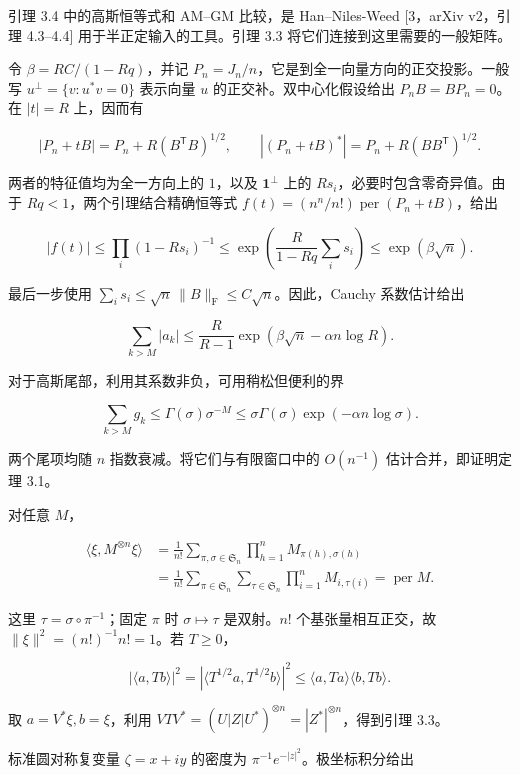 \documentclass[11pt,a4paper]{article}
\begin{document}
引理 3.4 中的高斯恒等式和 AM--GM 比较，是 Han--Niles-Weed {[}3，arXiv v2，引理 4.3--4.4{]} 用于半正定输入的工具。引理 3.3 将它们连接到这里需要的一般矩阵。

令 \(\beta=RC/(1-Rq)\)，并记 \(P_n=J_n/n\)，它是到全一向量方向的正交投影。一般写 \(u^\perp=\{v:u^*v=0\}\) 表示向量 \(u\) 的正交补。双中心化假设给出 \(P_nB=BP_n=0\)。在 \(|t|=R\) 上，因而有

\[
|P_n+tB|=P_n+R(B^{\mathsf T}B)^{1/2},
\qquad
|(P_n+tB)^*|=P_n+R(BB^{\mathsf T})^{1/2}.
\]

两者的特征值均为全一方向上的 \(1\)，以及 \(\mathbf1^\perp\) 上的 \(Rs_i\)，必要时包含零奇异值。由于 \(Rq<1\)，两个引理结合精确恒等式 \(f(t)=(n^n/n!)\operatorname{per}(P_n+tB)\)，给出

\[
|f(t)|\le\prod_i(1-Rs_i)^{-1}
\le\exp\!\left(\frac{R}{1-Rq}\sum_i s_i\right)
\le\exp(\beta\sqrt n).
\]

最后一步使用 \(\sum_i s_i\le\sqrt n\,\|B\|_{\mathrm F}\le C\sqrt n\)。因此，Cauchy 系数估计给出

\[
\sum_{k>M}|a_k|
\le\frac{R}{R-1}
\exp\!\left(\beta\sqrt n-\alpha n\log R\right).
\]

对于高斯尾部，利用其系数非负，可用稍松但便利的界

\[
\sum_{k>M}g_k
\le \Gamma(\sigma)\sigma^{-M}
\le\sigma\Gamma(\sigma)\exp\!\left(-\alpha n\log\sigma\right).
\]

两个尾项均随 \(n\) 指数衰减。将它们与有限窗口中的 \(O(n^{-1})\) 估计合并，即证明定理 3.1。

对任意 \(M\)，

\[
\begin{aligned}
\langle\xi,M^{\otimes n}\xi\rangle
&=\frac1{n!}\sum_{\pi,\sigma\in \mathfrak S_n}\prod_{h=1}^nM_{\pi(h),\sigma(h)}\\
&=\frac1{n!}\sum_{\pi\in \mathfrak S_n}\sum_{\tau\in \mathfrak S_n}\prod_{i=1}^nM_{i,\tau(i)}
=\operatorname{per}M.
\end{aligned}
\]

这里 \(\tau=\sigma\circ\pi^{-1}\)；固定 \(\pi\) 时 \(\sigma\mapsto\tau\) 是双射。\(n!\) 个基张量相互正交，故 \(\|\xi\|^2=(n!)^{-1}n!=1\)。若 \(T\ge0\)，

\[
|\langle a,Tb\rangle|^2
=|\langle T^{1/2}a,T^{1/2}b\rangle|^2
\le\langle a,Ta\rangle\langle b,Tb\rangle.
\]

取 \(a=V^*\xi,b=\xi\)，利用 \(VTV^*=(U|Z|U^*)^{\otimes n}=|Z^*|^{\otimes n}\)，得到引理 3.3。

标准圆对称复变量 \(\zeta=x+iy\) 的密度为 \(\pi^{-1}e^{-|z|^2}\)。极坐标积分给出
\end{document}
